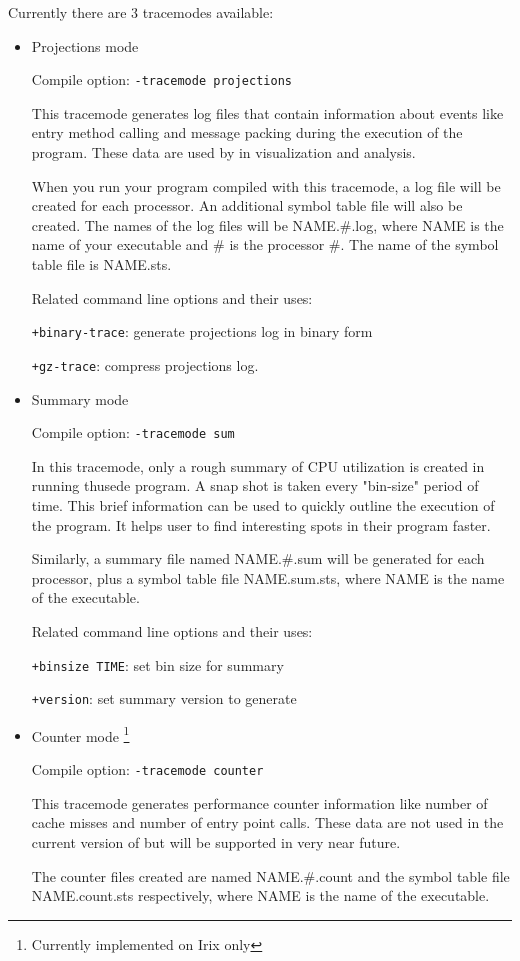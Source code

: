\documentclass[10pt,dvips]{article}
\begin{document}
Currently there are 3 tracemodes available:
\begin{itemize}
\item
Projections mode

Compile option: {\tt -tracemode projections}

This tracemode generates log files that contain information about events like
entry method calling and message packing during the execution of the program.
These data are used by \projections{} in visualization and analysis.

When you run your program compiled with this tracemode, a log file will be
created for each processor.  An additional symbol table file will also be
created.  The names of the log files will be NAME.\#.log, where NAME is the
name of your executable and \# is the processor \#.  The name of the symbol
table file is NAME.sts.

Related command line options and their uses:

{\tt +binary-trace}:  generate projections log in binary form

{\tt +gz-trace}:      compress projections log.

\item
Summary mode

Compile option: {\tt -tracemode sum}

In this tracemode, only a rough summary of CPU utilization is created in running
thusede program. A snap shot is taken every "bin-size" period of time. This brief
information can be used to quickly outline the execution of the program. It helps
user to find interesting spots in their program faster.

Similarly, a summary file named NAME.\#.sum will be generated for each processor,
plus a symbol table file NAME.sum.sts, where NAME is the name of the executable.

Related command line options and their uses:

{\tt +binsize TIME}:   set bin size for summary

{\tt +version}:        set summary version to generate

\item
Counter mode \footnote{Currently implemented on Irix only}

Compile option: {\tt -tracemode counter}

This tracemode generates performance counter information like number of cache
misses and number of entry point calls. These data are not used in the current
version of \projections{} but will be supported in very near future.

The counter files created are named NAME.\#.count and the symbol table file
NAME.count.sts respectively, where NAME is the name of the executable.

\end{itemize}
\end{document}
